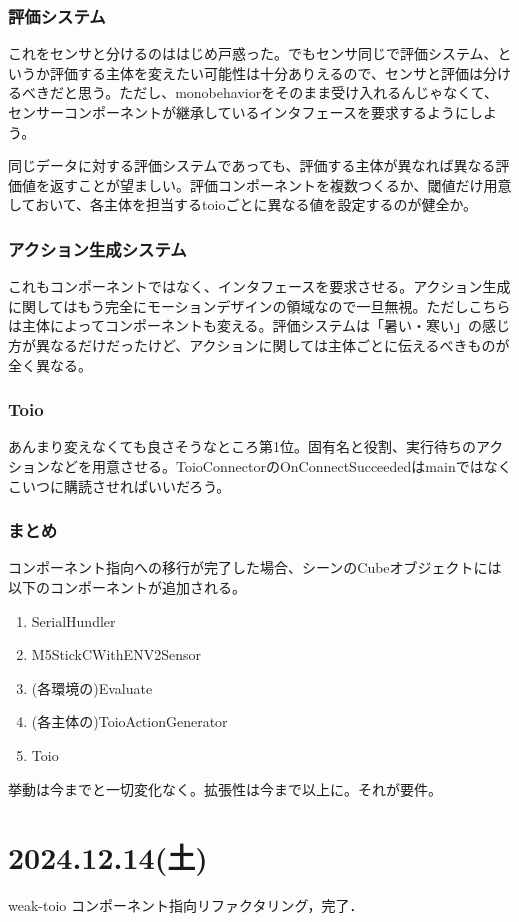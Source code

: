 \documentclass[fleqn,twocolumn]{mynote}
\begin{document}
\subsubsection*{評価システム}
これをセンサと分けるのははじめ戸惑った。でもセンサ同じで評価システム、というか評価する主体を変えたい可能性は十分ありえるので、センサと評価は分けるべきだと思う。ただし、monobehaviorをそのまま受け入れるんじゃなくて、センサーコンポーネントが継承しているインタフェースを要求するようにしよう。

同じデータに対する評価システムであっても、評価する主体が異なれば異なる評価値を返すことが望ましい。評価コンポーネントを複数つくるか、閾値だけ用意しておいて、各主体を担当するtoioごとに異なる値を設定するのが健全か。

\subsubsection*{アクション生成システム}
これもコンポーネントではなく、インタフェースを要求させる。アクション生成に関してはもう完全にモーションデザインの領域なので一旦無視。ただしこちらは主体によってコンポーネントも変える。評価システムは「暑い・寒い」の感じ方が異なるだけだったけど、アクションに関しては主体ごとに伝えるべきものが全く異なる。

\subsubsection*{Toio}
あんまり変えなくても良さそうなところ第1位。固有名と役割、実行待ちのアクションなどを用意させる。ToioConnectorのOnConnectSucceededはmainではなくこいつに購読させればいいだろう。
\subsubsection*{まとめ}
コンポーネント指向への移行が完了した場合、シーンのCubeオブジェクトには以下のコンポーネントが追加される。
\begin{enumerate}
  \item SerialHundler
  \item M5StickCWithENV2Sensor
  \item (各環境の)Evaluate
  \item (各主体の)ToioActionGenerator
  \item Toio
\end{enumerate}

挙動は今までと一切変化なく。拡張性は今まで以上に。それが要件。

\section*{2024.12.14(土)}
weak-toio コンポーネント指向リファクタリング，完了．
\end{document}
